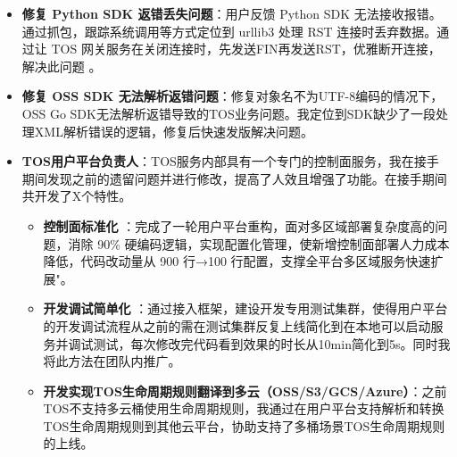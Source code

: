 \documentclass{resume}
\begin{document}
{\begin{itemize}[parsep=0.5ex]
\begin{itemize}[parsep=0.5ex]
        \item \textbf {修复 Python SDK 返错丢失问题}：用户反馈 Python SDK 无法接收报错。通过抓包，跟踪系统调用等方式定位到 urllib3 处理 RST 连接时丢弃数据。通过让 TOS 网关服务在关闭连接时，先发送FIN再发送RST，优雅断开连接，解决此问题 。

        \item \textbf {修复 OSS SDK 无法解析返错问题}：修复对象名不为UTF-8编码的情况下，OSS Go SDK无法解析返错导致的TOS业务问题。我定位到SDK缺少了一段处理XML解析错误的逻辑，修复后快速发版解决问题。
    \end{itemize}
  \end{itemize}

   \begin{itemize}[parsep=0.5ex]
    \item \textbf{TOS用户平台负责人}：TOS服务内部具有一个专门的控制面服务，我在接手期间发现之前的遗留问题并进行修改，提高了人效且增强了功能。在接手期间共开发了X个特性。
      \begin{itemize}[parsep=0.5ex]
        \item \textbf{控制面标准化} ：完成了一轮用户平台重构，面对多区域部署复杂度高的问题，消除 90\% 硬编码逻辑，实现配置化管理，使新增控制面部署人力成本降低，代码改动量从 900 行→100 行配置，支撑全平台多区域服务快速扩展"。

        \item \textbf{开发调试简单化} ：通过接入框架，建设开发专用测试集群，使得用户平台的开发调试流程从之前的需在测试集群反复上线简化到在本地可以启动服务并调试测试，每次修改完代码看到效果的时长从10min简化到5s。同时我将此方法在团队内推广。
    
        \item \textbf{开发实现TOS生命周期规则翻译到多云（OSS/S3/GCS/Azure）}：之前TOS不支持多云桶使用生命周期规则，我通过在用户平台支持解析和转换TOS生命周期规则到其他云平台，协助支持了多桶场景TOS生命周期规则的上线。
      \end{itemize}
    \end{itemize}


}
\end{document}
